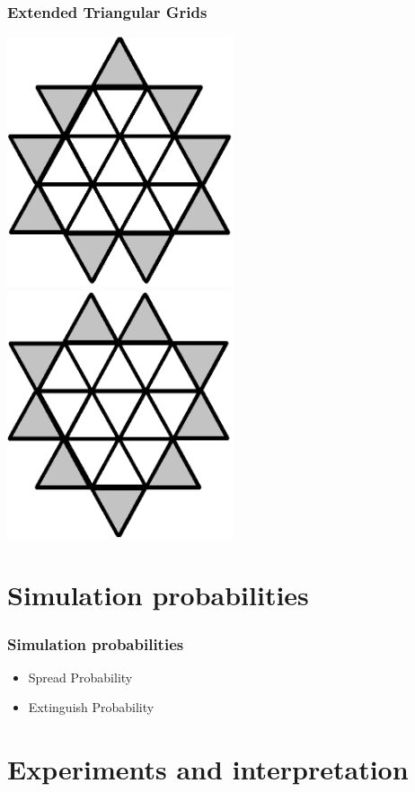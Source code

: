 \documentclass{beamer}
\begin{document}
\begin{frame}
\frametitle{Extended Triangular Grids}
\includegraphics[width=0.5\textwidth]{imgs/extendedtriangle1.png}
\includegraphics[width=0.5\textwidth]{imgs/extendedtriangle2.png}
\end{frame}

\section{Simulation probabilities} 

\begin{frame}
\frametitle{Simulation probabilities}
\begin{itemize}
\item{Spread Probability}
\item{Extinguish Probability}
\end{itemize}
\end{frame}

\section{Experiments and interpretation} 
\end{document}
